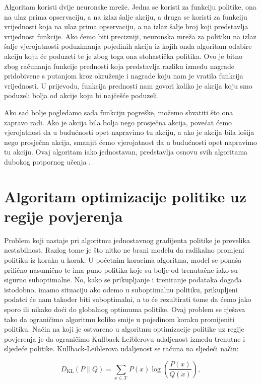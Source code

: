 \documentclass[times,utf8,diplomski]{fer}
\begin{document}
\bigskip

Algoritam koristi dvije neuronske mreže. Jedna se koristi za funkciju politike, ona na ulaz prima opservaciju, a na izlaz šalje akciju, a druga se koristi za funkciju vrijednosti koja na ulaz prima opservaciju, a na izlaz šalje broj koji predstavlja vrijednost funkcije. Ako ćemo biti precizniji, neuronska mreža za politiku na izlaz šalje vjerojatnosti poduzimanja pojedinih akcija iz kojih onda algoritam odabire akciju koju će poduzeti te je zbog toga ona stohastička politika. Ovo je bitno zbog računanja funkcije prednosti koja predstavlja razliku između nagrade pridobivene s putanjom kroz okruženje i nagrade koju nam je vratila funkcija vrijednosti. U prijevodu, funkcija prednosti nam govori koliko je akcija koju smo poduzeli bolja od akcije koju bi najčešće poduzeli.

Ako sad bolje pogledamo sada funkciju pogreške, možemo shvatiti što ona zapravo radi. Ako je akcija bila bolja nego prosječna akcija, povećat ćemo vjerojatnost da u budućnosti opet napravimo tu akciju, a ako je akcija bila lošija nego prosječna akcija, smanjit ćemo vjerojatnost da u budućnosti opet napravimo tu akciju. Ovaj algoritam iako jednostavan, predstavlja osnovu svih algoritama dubokog potpornog učenja \citep{schulman}.

\section{Algoritam optimizacije politike uz regije povjerenja}

Problem koji nastaje pri algoritmu jednostavnog gradijenta politike je prevelika nestabilnost. Razlog tome je što nitko ne brani modelu da radikalno promjeni politiku iz koraka u korak. U početnim koracima algoritma, model se ponaša prilično nasumično te ima puno politika koje su bolje od trenutačne iako su sigurno suboptimalne. No, kako se prikupljanje i treniranje podataka događa istodobno, imamo situaciju ako odemo u suboptimalnu politiku, prikupljeni podatci će nam također biti suboptimalni, a to će rezultirati tome da ćemo jako sporo ili nikako doći do globalnog optimuma politike. Ovaj problem se rješava tako da ograničimo algoritmu koliko smije u pojedinom koraku promijeniti politiku. Način na koji je ostvareno u algoritmu optimizacije politike uz regije povjerenja \citep{trpo} je da ograničimo Kullback-Leiblerovu udaljenost između trenutne i sljedeće politike. Kullback-Leiblerova udaljenost se računa na sljedeći način:

\begin{equation}
	\label{Kullback - Leibler}
	D_\text{KL}(P \parallel Q) = \sum_{x\in\mathcal{X}} P(x) \log\left(\frac{P(x)}{Q(x)}\right),
\end{equation}
\end{document}
